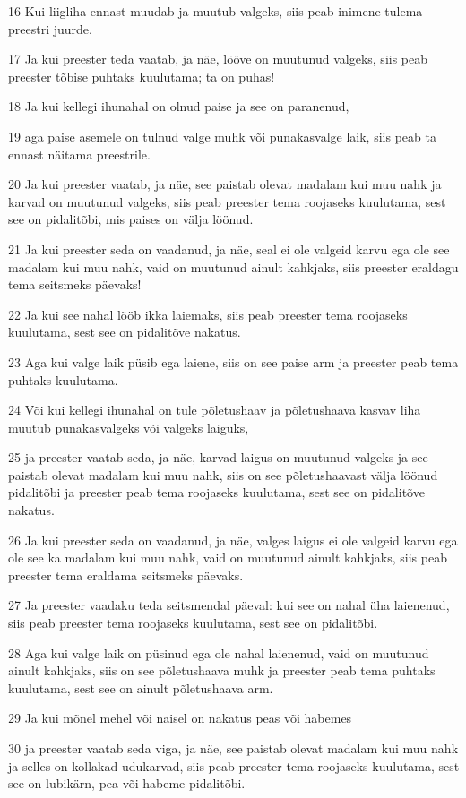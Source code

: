 \par 16 Kui liigliha ennast muudab ja muutub valgeks, siis peab inimene tulema preestri juurde.
\par 17 Ja kui preester teda vaatab, ja näe, lööve on muutunud valgeks, siis peab preester tõbise puhtaks kuulutama; ta on puhas!
\par 18 Ja kui kellegi ihunahal on olnud paise ja see on paranenud,
\par 19 aga paise asemele on tulnud valge muhk või punakasvalge laik, siis peab ta ennast näitama preestrile.
\par 20 Ja kui preester vaatab, ja näe, see paistab olevat madalam kui muu nahk ja karvad on muutunud valgeks, siis peab preester tema roojaseks kuulutama, sest see on pidalitõbi, mis paises on välja löönud.
\par 21 Ja kui preester seda on vaadanud, ja näe, seal ei ole valgeid karvu ega ole see madalam kui muu nahk, vaid on muutunud ainult kahkjaks, siis preester eraldagu tema seitsmeks päevaks!
\par 22 Ja kui see nahal lööb ikka laiemaks, siis peab preester tema roojaseks kuulutama, sest see on pidalitõve nakatus.
\par 23 Aga kui valge laik püsib ega laiene, siis on see paise arm ja preester peab tema puhtaks kuulutama.
\par 24 Või kui kellegi ihunahal on tule põletushaav ja põletushaava kasvav liha muutub punakasvalgeks või valgeks laiguks,
\par 25 ja preester vaatab seda, ja näe, karvad laigus on muutunud valgeks ja see paistab olevat madalam kui muu nahk, siis on see põletushaavast välja löönud pidalitõbi ja preester peab tema roojaseks kuulutama, sest see on pidalitõve nakatus.
\par 26 Ja kui preester seda on vaadanud, ja näe, valges laigus ei ole valgeid karvu ega ole see ka madalam kui muu nahk, vaid on muutunud ainult kahkjaks, siis peab preester tema eraldama seitsmeks päevaks.
\par 27 Ja preester vaadaku teda seitsmendal päeval: kui see on nahal üha laienenud, siis peab preester tema roojaseks kuulutama, sest see on pidalitõbi.
\par 28 Aga kui valge laik on püsinud ega ole nahal laienenud, vaid on muutunud ainult kahkjaks, siis on see põletushaava muhk ja preester peab tema puhtaks kuulutama, sest see on ainult põletushaava arm.
\par 29 Ja kui mõnel mehel või naisel on nakatus peas või habemes
\par 30 ja preester vaatab seda viga, ja näe, see paistab olevat madalam kui muu nahk ja selles on kollakad udukarvad, siis peab preester tema roojaseks kuulutama, sest see on lubikärn, pea või habeme pidalitõbi.
